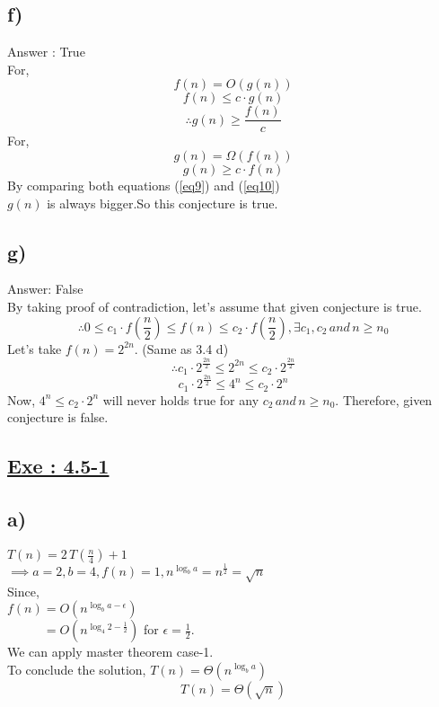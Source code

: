 \documentclass[a4paper, 11pt]{article}
\begin{document}
\subsection*{f)}
Answer : True\\
For,
$$f(n) = O(g(n))$$
$$f(n) \le c \cdot g(n)$$
\begin{equation}
\label{eq9}
\therefore g(n) \ge \frac {f(n)}{c}  
\end{equation}
For,
$$g(n) = \Omega (f(n))$$
\begin{equation}
\label{eq10}
g(n) \ge c \cdot f(n)
\end{equation}
By comparing both equations (\ref{eq9}) and (\ref{eq10}) \\
$g(n)$ is always bigger.So this conjecture is true.

\subsection*{g)}
Answer: False \\
By taking proof of contradiction, let's assume that given conjecture is true.
$$\therefore 0 \le c_{1} \cdot f(\frac{n}{2}) \le f(n) \le c_{2} \cdot f(\frac{n}{2}) , \exists c_{1}, c_{2} \, and \, n \ge n_{0}$$
Let's take $f(n) = 2^{2n}$. (Same as 3.4 d) 
$$\therefore c_{1} \cdot 2^{\frac{2n}{2}} \le 2^{2n} \le c_{2} \cdot 2^{\frac{2n}{2}}$$
$$c_{1} \cdot 2^{\frac{2n}{2}} \le 4^{n} \le c_{2} \cdot 2^n$$
Now, $4^n \le c_{2} \cdot 2^n $ will never holds true for any $c_{2} \, and \, n \ge n_{0}$. Therefore, given conjecture is false.

\subsection*{\underline{Exe : 4.5-1}}
\subsection*{a)}
$T(n) = 2\,T(\frac{n}{4}) +1 $ \\
$\implies a=2, b=4, f(n) = 1 , n^{\log_{b}a} = n^{\frac{1}{2}} = \sqrt{n}$ \\
Since,\\
$f(n) = O(n^{\log_{b}a - \epsilon})$\\
$\phantom{f(n)} = O(n^{\log_{4}2 - \frac{1}{2}})$ for $ \epsilon = \frac{1}{2}.$\\
We can apply master theorem case-1.\\
To conclude the solution, $T(n) = \Theta(n^{\log_{b}a})$
$$T(n) = \Theta (\sqrt{n})$$
\end{document}
